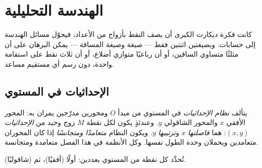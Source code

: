 \chapter{الهندسة التحليلية}\label{ch:g10:coordgeom}

كانت فكرة ديكارت الكبرى أن يصف النقط بأزواج من الأعداد، فيحوّل
مسائل الهندسة إلى حسابات. وبصيغتين اثنتين فقط --- صيغة 
وصيغة المسافة --- يمكن البرهان على أن مثلثًا متساوي الساقين،
أو أن رباعيًا متوازي أضلاع، أو أن ثلاث نقط على استقامة واحدة،
دون رسم أي مستقيم مساعد.

\section{الإحداثيات في المستوي}

\begin{definition}\label{def:g10:coordgeom:system}
يتألف \emph{نظام الإحداثيات} في المستوي
من مبدأ $O$ ومحورين مدرّجين يمران به: المحور الأفقي
$x$ والمحور الشاقولي $y$. وعندئذٍ يكون لكل نقطة $M$ زوج وحيد من
\emph{الإحداثيات} $(x, y)$: هما
\emph{فاصلتها} $x$ و\emph{ترتيبها} $y$.
ويكون النظام \emph{متعامدًا ومتجانسًا} إذا كان المحوران
متعامدين ويحملان وحدة الطول نفسها. وكل الأنظمة في هذا
الفصل متعامدة ومتجانسة.
\end{definition}

\begin{omfigure}

{\small تُحدَّد كل نقطة من المستوي بعددين:  أولًا
(أفقيًا)، ثم  (شاقوليًا).}
\end{omfigure}

